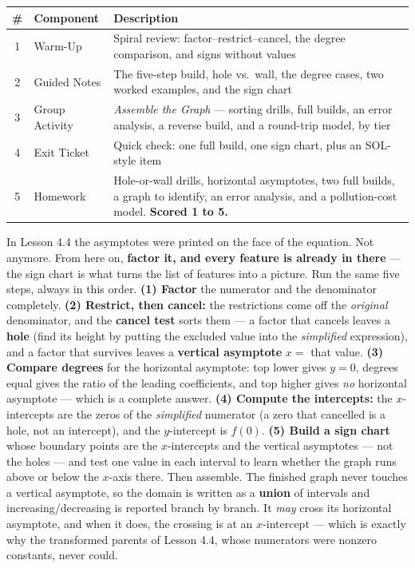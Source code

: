 \documentclass[10pt]{article}
\begin{document}
\begin{tocbox}
\small
\renewcommand{\arraystretch}{1.5}
\begin{tabularx}{\linewidth}{@{} c l X @{}}
\rowcolor{forestbg}
\textbf{\#} & \textbf{Component} & \textbf{Description} \\
\midrule
1 & Warm-Up        & Spiral review: factor--restrict--cancel, the degree comparison, and signs without values \\
2 & Guided Notes   & The five-step build, hole vs.\ wall, the degree cases, two worked examples, and the sign chart \\
3 & Group Activity & \emph{Assemble the Graph} --- sorting drills, full builds, an error analysis, a reverse build, and a round-trip model, by tier \\
4 & Exit Ticket    & Quick check: one full build, one sign chart, plus an SOL-style item \\
5 & Homework       & Hole-or-wall drills, horizontal asymptotes, two full builds, a graph to identify, an error analysis, and a pollution-cost model. \textbf{Scored 1 to 5.} \\
\end{tabularx}
\end{tocbox}

\vspace{0.10in}

\begin{remindbox}
\small In Lesson 4.4 the asymptotes were printed on the face of the equation. Not anymore. From here on,
\textbf{factor it, and every feature is already in there} --- the sign chart is what turns the list of
features into a picture. Run the same five steps, always in this order. \textbf{(1) Factor} the
numerator and the denominator completely. \textbf{(2) Restrict, then cancel:} the restrictions come off
the \emph{original} denominator, and the \textbf{cancel test} sorts them --- a factor that cancels
leaves a \textbf{hole} (find its height by putting the excluded value into the \emph{simplified}
expression), and a factor that survives leaves a \textbf{vertical asymptote} $x=$ that value.
\textbf{(3) Compare degrees} for the horizontal asymptote: top lower gives $y=0$, degrees equal gives
the ratio of the leading coefficients, and top higher gives \emph{no} horizontal asymptote --- which is
a complete answer. \textbf{(4) Compute the intercepts:} the $x$-intercepts are the zeros of the
\emph{simplified} numerator (a zero that cancelled is a hole, not an intercept), and the $y$-intercept
is $f(0)$. \textbf{(5) Build a sign chart} whose boundary points are the $x$-intercepts and the vertical
asymptotes --- not the holes --- and test one value in each interval to learn whether the graph runs
above or below the $x$-axis there. Then assemble. The finished graph never touches a vertical
asymptote, so the domain is written as a \textbf{union} of intervals and increasing/decreasing is
reported branch by branch. It \emph{may} cross its horizontal asymptote, and when it does, the crossing
is at an $x$-intercept --- which is exactly why the transformed parents of Lesson 4.4, whose numerators
were nonzero constants, never could.
\end{remindbox}
\end{document}
